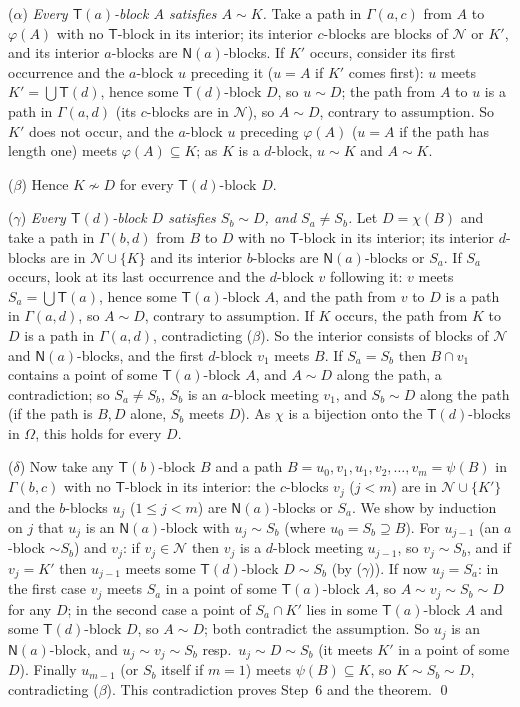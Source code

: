 \documentclass[11pt]{amsart}
\theoremstyle{definition}
\newcommand{\T}{\mathsf{T}}
\newcommand{\N}{\mathsf{N}}
\begin{document}
($\alpha$) \emph{Every $\T(a)$-block $A$ satisfies $A\sim K$.} Take a path in $\Gamma(a,c)$ from $A$ to $\varphi(A)$ with no $\T$-block in its interior; its interior $c$-blocks are blocks of $\mathcal N$ or $K'$, and its interior $a$-blocks are $\N(a)$-blocks. If $K'$ occurs, consider its first occurrence and the $a$-block $u$ preceding it ($u=A$ if $K'$ comes first): $u$ meets $K'=\bigcup\T(d)$, hence some $\T(d)$-block $D$, so $u\sim D$; the path from $A$ to $u$ is a path in $\Gamma(a,d)$ (its $c$-blocks are in $\mathcal N$), so $A\sim D$, contrary to assumption. So $K'$ does not occur, and the $a$-block $u$ preceding $\varphi(A)$ ($u=A$ if the path has length one) meets $\varphi(A)\subseteq K$; as $K$ is a $d$-block, $u\sim K$ and $A\sim K$.

($\beta$) Hence $K\not\sim D$ for every $\T(d)$-block $D$.

($\gamma$) \emph{Every $\T(d)$-block $D$ satisfies $S_b\sim D$, and $S_a\ne S_b$.} Let $D=\chi(B)$ and take a path in $\Gamma(b,d)$ from $B$ to $D$ with no $\T$-block in its interior; its interior $d$-blocks are in $\mathcal N\cup\{K\}$ and its interior $b$-blocks are $\N(a)$-blocks or $S_a$. If $S_a$ occurs, look at its last occurrence and the $d$-block $v$ following it: $v$ meets $S_a=\bigcup\T(a)$, hence some $\T(a)$-block $A$, and the path from $v$ to $D$ is a path in $\Gamma(a,d)$, so $A\sim D$, contrary to assumption. If $K$ occurs, the path from $K$ to $D$ is a path in $\Gamma(a,d)$, contradicting ($\beta$). So the interior consists of blocks of $\mathcal N$ and $\N(a)$-blocks, and the first $d$-block $v_1$ meets $B$. If $S_a=S_b$ then $B\cap v_1$ contains a point of some $\T(a)$-block $A$, and $A\sim D$ along the path, a contradiction; so $S_a\ne S_b$, $S_b$ is an $a$-block meeting $v_1$, and $S_b\sim D$ along the path (if the path is $B,D$ alone, $S_b$ meets $D$). As $\chi$ is a bijection onto the $\T(d)$-blocks in $\Omega$, this holds for every $D$.

($\delta$) Now take any $\T(b)$-block $B$ and a path $B=u_0,v_1,u_1,v_2,\dots,v_m=\psi(B)$ in $\Gamma(b,c)$ with no $\T$-block in its interior: the $c$-blocks $v_j$ ($j<m$) are in $\mathcal N\cup\{K'\}$ and the $b$-blocks $u_j$ ($1\le j<m$) are $\N(a)$-blocks or $S_a$. We show by induction on $j$ that $u_j$ is an $\N(a)$-block with $u_j\sim S_b$ (where $u_0=S_b\supseteq B$). For $u_{j-1}$ (an $a$-block $\sim S_b$) and $v_j$: if $v_j\in\mathcal N$ then $v_j$ is a $d$-block meeting $u_{j-1}$, so $v_j\sim S_b$, and if $v_j=K'$ then $u_{j-1}$ meets some $\T(d)$-block $D\sim S_b$ (by ($\gamma$)). If now $u_j=S_a$: in the first case $v_j$ meets $S_a$ in a point of some $\T(a)$-block $A$, so $A\sim v_j\sim S_b\sim D$ for any $D$; in the second case a point of $S_a\cap K'$ lies in some $\T(a)$-block $A$ and some $\T(d)$-block $D$, so $A\sim D$; both contradict the assumption. So $u_j$ is an $\N(a)$-block, and $u_j\sim v_j\sim S_b$ resp.\ $u_j\sim D\sim S_b$ (it meets $K'$ in a point of some $D$). Finally $u_{m-1}$ (or $S_b$ itself if $m=1$) meets $\psi(B)\subseteq K$, so $K\sim S_b\sim D$, contradicting ($\beta$). This contradiction proves Step~6 and the theorem. \qed
\end{document}
